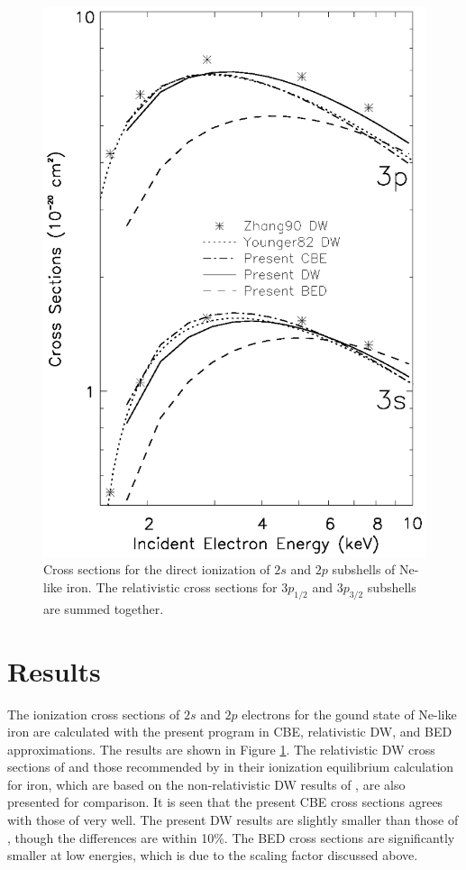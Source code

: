 \documentclass[preprint, floatfix, pra, showpacs, showkeys]{revtex4}
\begin{document}
\begin{figure}
\includegraphics[width=5in]{ion.eps}
\caption{\label{fig_comparison}Cross sections for the direct
ionization of $2s$ and $2p$ subshells of Ne-like iron. The relativistic cross
sections for $3p_{1/2}$ and $3p_{3/2}$ subshells are summed together.} 
\end{figure}

\section{Results}
\label{sec_results}
The ionization cross sections of $2s$ and $2p$ electrons for the gound state
of Ne-like iron are calculated with the present program in CBE, relativistic
DW, and BED approximations. 
The results are shown in Figure \ref{fig_comparison}. The relativistic DW
cross sections of \textcite{zhang90} and those recommended by
\textcite{arnaud92} in their ionization equilibrium 
calculation for iron, which are based on the non-relativistic DW results of
\textcite{younger82}, are also presented for comparison. It is seen that the
present CBE cross sections agrees with those of \textcite{younger82} very
well. The present DW results are slightly smaller than those of
\textcite{zhang90}, though the differences are within 10\%. The BED cross
sections are significantly smaller at low energies, which is 
due to the scaling factor discussed above.
\end{document}
